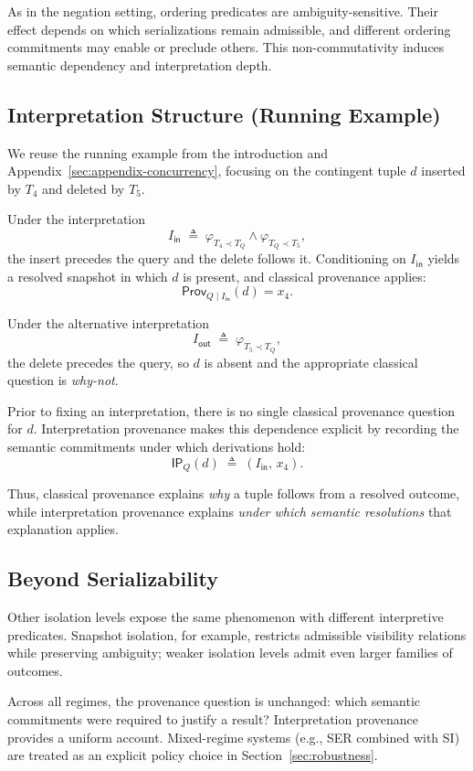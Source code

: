 \documentclass[acmsmall,nonacm]{acmart}
\theoremstyle{remark}
\numberwithin{definition}{section}
\numberwithin{theorem}{section}
\numberwithin{lemma}{section}
\numberwithin{corollary}{section}
\numberwithin{remark}{section}
\numberwithin{example}{section}
\numberwithin{observation}{section}
\numberwithin{assumption}{section}
\newcommand{\Prov}{\mathsf{Prov}}
\begin{document}
As in the negation setting, ordering predicates are ambiguity-sensitive.
Their effect depends on which serializations remain admissible, and different
ordering commitments may enable or preclude others.
This non-commutativity induces semantic dependency and interpretation depth.

\subsection{Interpretation Structure (Running Example)}

We reuse the running example from the introduction and
Appendix~\ref{sec:appendix-concurrency}, focusing on the contingent tuple $d$
inserted by $T_4$ and deleted by $T_5$.

Under the interpretation
\[
  I_{\mathsf{in}} \;\triangleq\;
  \varphi_{T_4 \prec T_Q} \wedge \varphi_{T_Q \prec T_5},
\]
the insert precedes the query and the delete follows it.
Conditioning on $I_{\mathsf{in}}$ yields a resolved snapshot in which $d$ is
present, and classical provenance applies:
\[
  \Prov_{Q \mid I_{\mathsf{in}}}(d)=x_4.
\]

Under the alternative interpretation
\[
  I_{\mathsf{out}} \;\triangleq\; \varphi_{T_5 \prec T_Q},
\]
the delete precedes the query, so $d$ is absent and the appropriate classical
question is \emph{why-not}.

Prior to fixing an interpretation, there is no single classical provenance
question for $d$.
Interpretation provenance makes this dependence explicit by recording the semantic
commitments under which derivations hold:
\[
  \mathsf{IP}_Q(d) \;\triangleq\; (I_{\mathsf{in}},\, x_4).
\]

Thus, classical provenance explains \emph{why} a tuple follows from a resolved
outcome, while interpretation provenance explains \emph{under which semantic
resolutions} that explanation applies.

\subsection{Beyond Serializability}

Other isolation levels expose the same phenomenon with different interpretive
predicates.
Snapshot isolation, for example, restricts admissible visibility relations while
preserving ambiguity; weaker isolation levels admit even larger families of
outcomes.

Across all regimes, the provenance question is unchanged:
which semantic commitments were required to justify a result?
Interpretation provenance provides a uniform account.
Mixed-regime systems (e.g., SER combined with SI) are treated as an explicit
policy choice in Section~\ref{sec:robustness}.
\end{document}
